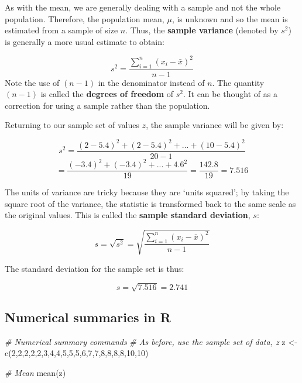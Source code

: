 \documentclass[
  oneside]{krantz}
\newenvironment{Shaded}{\begin{snugshade}}{\end{snugshade}}
\newcommand{\CommentTok}[1]{\textcolor[rgb]{0.56,0.35,0.01}{\textit{#1}}}
\newcommand{\DecValTok}[1]{\textcolor[rgb]{0.00,0.00,0.81}{#1}}
\newcommand{\FunctionTok}[1]{\textcolor[rgb]{0.00,0.00,0.00}{#1}}
\newcommand{\NormalTok}[1]{#1}
\newcommand{\OtherTok}[1]{\textcolor[rgb]{0.56,0.35,0.01}{#1}}
\begin{document}
As with the mean, we are generally dealing with a sample and not the whole population. Therefore, the population mean, \(\mu\), is unknown and so the mean is estimated from a sample of size \(n\). Thus, the \textbf{sample variance} (denoted by \(s^2\)) is generally a more usual estimate to obtain:

\[s^2 = \frac{\sum_{i=1}^n{(x_i - \bar x)^2}}{n-1} \]
Note the use of \((n-1)\) in the denominator instead of \(n\). The quantity \((n-1)\) is called the \textbf{degrees of freedom} of \(s^2\). It can be thought of as a correction for using a sample rather than the population.

Returning to our sample set of values \(z\), the sample variance will be given by:

\[s^2 = \frac{(2-5.4)^2 + (2-5.4)^2 + ... + (10-5.4)^2}{20-1}\]
\[ = \frac{(-3.4)^2 + (-3.4)^2 + ...+ 4.6^2}{19} = \frac{142.8}{19} = 7.516\]

The units of variance are tricky because they are `units squared'; by taking the square root of the variance, the statistic is transformed back to the same scale as the original values. This is called the \textbf{sample standard deviation}, \(s\):

\[s = \sqrt{s^2} = \sqrt{\frac{\sum_{i=1}^n{(x_i - \bar x)^2}}{n-1}} \]

The standard deviation for the sample set is thus:

\[s = \sqrt{7.516} = 2.741\]

\hypertarget{numerical-summaries-in-r}{%
\subsection{Numerical summaries in R}\label{numerical-summaries-in-r}}

\begin{Shaded}
\begin{Highlighting}[]
\CommentTok{\# Numerical summary commands }
\CommentTok{\# As before, use the sample set of data, z}
\NormalTok{z }\OtherTok{\textless{}{-}} \FunctionTok{c}\NormalTok{(}\DecValTok{2}\NormalTok{,}\DecValTok{2}\NormalTok{,}\DecValTok{2}\NormalTok{,}\DecValTok{2}\NormalTok{,}\DecValTok{2}\NormalTok{,}\DecValTok{3}\NormalTok{,}\DecValTok{4}\NormalTok{,}\DecValTok{4}\NormalTok{,}\DecValTok{5}\NormalTok{,}\DecValTok{5}\NormalTok{,}\DecValTok{5}\NormalTok{,}\DecValTok{6}\NormalTok{,}\DecValTok{7}\NormalTok{,}\DecValTok{7}\NormalTok{,}\DecValTok{8}\NormalTok{,}\DecValTok{8}\NormalTok{,}\DecValTok{8}\NormalTok{,}\DecValTok{8}\NormalTok{,}\DecValTok{10}\NormalTok{,}\DecValTok{10}\NormalTok{)}

\CommentTok{\# Mean}
\FunctionTok{mean}\NormalTok{(z)}
\end{Highlighting}
\end{Shaded}
\end{document}
